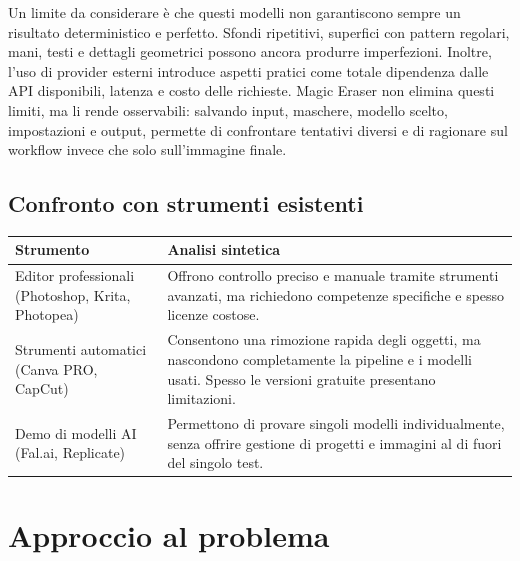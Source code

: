 \documentclass[oneside]{supsistudent}
\begin{document}
Un limite da considerare è che questi modelli non garantiscono sempre un
risultato deterministico e perfetto. Sfondi ripetitivi, superfici
con pattern regolari, mani, testi e dettagli geometrici possono ancora
produrre imperfezioni. Inoltre, l'uso di provider esterni introduce
aspetti pratici come totale dipendenza dalle API disponibili, latenza e costo
delle richieste. Magic Eraser non elimina questi limiti, ma li rende
osservabili: salvando input, maschere, modello scelto, impostazioni e output,
permette di confrontare tentativi diversi e di ragionare sul
workflow invece che solo sull'immagine finale.

\section{Confronto con strumenti esistenti}

\begin{center}
\begin{tabular}{|p{3.5cm}|p{9cm}|}
\hline
\textbf{Strumento} & \textbf{Analisi sintetica} \\
\hline
Editor professionali (Photoshop, Krita, Photopea)&
Offrono controllo preciso e manuale tramite strumenti avanzati,
ma richiedono competenze specifiche e spesso licenze costose.\\
\hline
Strumenti automatici (Canva PRO, CapCut) &
Consentono una rimozione rapida degli oggetti,
ma nascondono completamente la pipeline e i modelli usati. Spesso le versioni gratuite
presentano limitazioni. \\
\hline
Demo di modelli AI (Fal.ai, Replicate) &
Permettono di provare singoli modelli individualmente,
senza offrire gestione di progetti e immagini al di fuori del singolo test. \\
\hline
\end{tabular}
\end{center}

\chapter{Approccio al problema}
\end{document}
